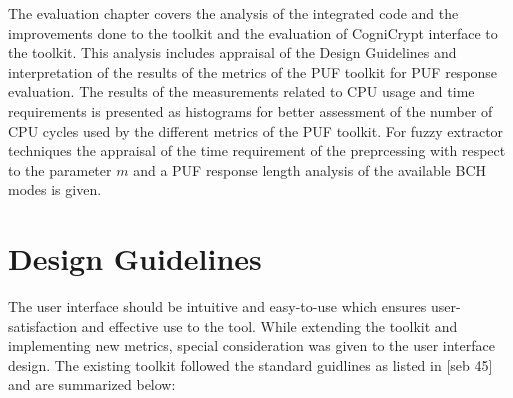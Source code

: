 The evaluation chapter covers the analysis of the integrated code and the improvements done to the toolkit and the evaluation of CogniCrypt interface to the toolkit. This analysis includes appraisal of the Design Guidelines and interpretation of the results of the metrics of the PUF toolkit for PUF response evaluation. The results of the measurements related to CPU usage and time requirements is presented as
histograms for better assessment of the number of CPU cycles used by the different metrics of the PUF toolkit. For fuzzy extractor techniques the appraisal of the time requirement of the preprcessing  with respect to the parameter $m$ and a PUF response length analysis of the available BCH modes is given.\\

\section{Design Guidelines}
The user interface should be intuitive and easy-to-use which ensures user-satisfaction and effective use to the tool. While extending the toolkit and implementing new metrics, special consideration was given to the user interface design. The existing toolkit followed the standard guidlines as listed in [seb 45] and are summarized below:

